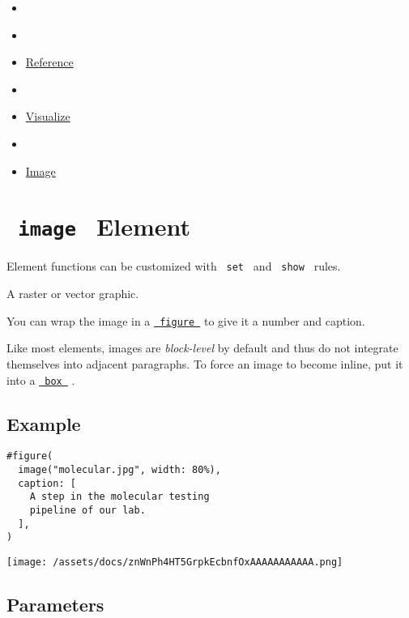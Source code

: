 \begin{itemize}
\tightlist
\item
  \href{/docs}{}
\item
  
\item
  \href{/docs/reference/}{Reference}
\item
  
\item
  \href{/docs/reference/visualize/}{Visualize}
\item
  
\item
  \href{/docs/reference/visualize/image/}{Image}
\end{itemize}

\section{\texorpdfstring{\texttt{\ image\ } {{ Element
}}}{ image   Element }}\label{summary}

\label{element-tooltip}
Element functions can be customized with \texttt{\ set\ } and
\texttt{\ show\ } rules.

A raster or vector graphic.

You can wrap the image in a
\href{/docs/reference/model/figure/}{\texttt{\ figure\ }} to give it a
number and caption.

Like most elements, images are \emph{block-level} by default and thus do
not integrate themselves into adjacent paragraphs. To force an image to
become inline, put it into a
\href{/docs/reference/layout/box/}{\texttt{\ box\ }} .

\subsection{Example}\label{example}

\begin{verbatim}
#figure(
  image("molecular.jpg", width: 80%),
  caption: [
    A step in the molecular testing
    pipeline of our lab.
  ],
)
\end{verbatim}

\texttt{[image: /assets/docs/znWnPh4HT5GrpkEcbnfOxAAAAAAAAAAA.png]}

\subsection{\texorpdfstring{{ Parameters
}}{ Parameters }}\label{parameters}

